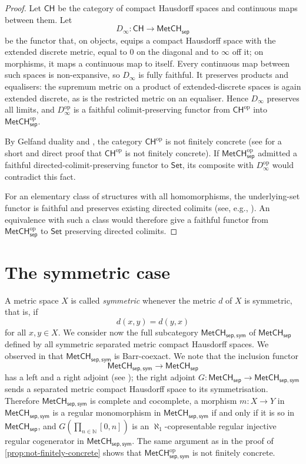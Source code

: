 \documentclass[11pt]{amsart}
\theoremstyle{definition}
\newcommand{\cat}[1]{\mathsf{#1}}
\newcommand{\op}{\mathrm{op}}
\newcommand{\MetCHsep}{\cat{MetCH_{sep}}}
\newcommand{\MetCHsepop}{\cat{MetCH}_\cat{sep}^\op}
\newcommand{\MetCHsepsym}{\cat{MetCH_{sep,sym}}}
\newcommand{\MetCHsepsymop}{\cat{MetCH_{sep,sym}^\op}}
\newcommand{\CH}{\cat{CH}}
\newcommand{\Set}{\cat{Set}}
\newcommand{\N}{\mathbb{N}}
\begin{document}
\begin{proof}
  Let $\CH$ be the category of compact Hausdorff spaces and continuous maps between them.
  Let
  \[
    D_\infty\colon\CH\longrightarrow\MetCHsep
  \]
  be the functor that, on objects, equips a compact Hausdorff space with the extended discrete metric, equal to \(0\) on the diagonal and to \(\infty\) off it; on morphisms, it maps a continuous map to itself. Every continuous map between such spaces is non-expansive, so \(D_\infty\) is fully faithful. It preserves products and equalisers: the supremum metric on a product of extended-discrete spaces is again extended discrete, as is the restricted metric on an equaliser. Hence \(D_\infty\) preserves all limits, and \(D_\infty^{\op}\) is a faithful colimit-preserving functor from \(\CH^{\op}\) into \(\MetCHsepop\).

  By Gelfand duality and \cite[proof of Thm.~22]{LRV23}, the category \(\CH^{\op}\) is not finitely concrete (see \cite{Abb26} for a short and direct proof that \(\CH^{\op}\) is not finitely concrete).
  If \(\MetCHsepop\) admitted a faithful directed-colimit-preserving functor to \(\Set\), its composite with \(D_\infty^{\op}\) would contradict this fact.

  For an elementary class of structures with all homomorphisms, the underlying-set functor is faithful and preserves existing directed colimits (see, e.g., \cite[p.~4, after Rem.~5]{LRV23}).
  An equivalence with such a class would therefore give a faithful functor from \(\MetCHsepop\) to \(\Set\) preserving directed colimits.
\end{proof}

\section{The symmetric case}
\label{sec:symmetric-case}

A metric space \(X\) is called \emph{symmetric} whenever the metric \(d\) of \(X\) is symmetric, that is, if
\begin{displaymath}
  d(x,y)=d(y,x)
\end{displaymath}
for all \(x,y\in X\).
We consider now the full subcategory \(\MetCHsepsym\) of \(\MetCHsep\) defined by all symmetric separated metric compact Hausdorff spaces.
We observed in \cite[Thm.~6.1]{AH25} that \(\MetCHsepsym\) is Barr-coexact.
We note that the inclusion functor
\begin{displaymath}
  \MetCHsepsym \longrightarrow \MetCHsep
\end{displaymath}
has a left and a right adjoint (see \cite[Rem.~2.8]{AH25}); the right adjoint \(G \colon \MetCHsep\to\MetCHsepsym\) sends a separated metric compact Hausdorff space to its symmetrisation.
Therefore \(\MetCHsepsym\) is complete and cocomplete, a morphism \(m \colon X\to Y\) in \(\MetCHsepsym\) is a regular monomorphism in \(\MetCHsepsym\) if and only if it is so in \(\MetCHsep\), and \(G(\prod_{n \in \N}[0,n])\) is an \(\aleph_1\)-copresentable regular injective regular cogenerator in \(\MetCHsepsym\).
The same argument as in the proof of \cref{prop:not-finitely-concrete} shows that \(\MetCHsepsymop\) is not finitely concrete.
\end{document}
